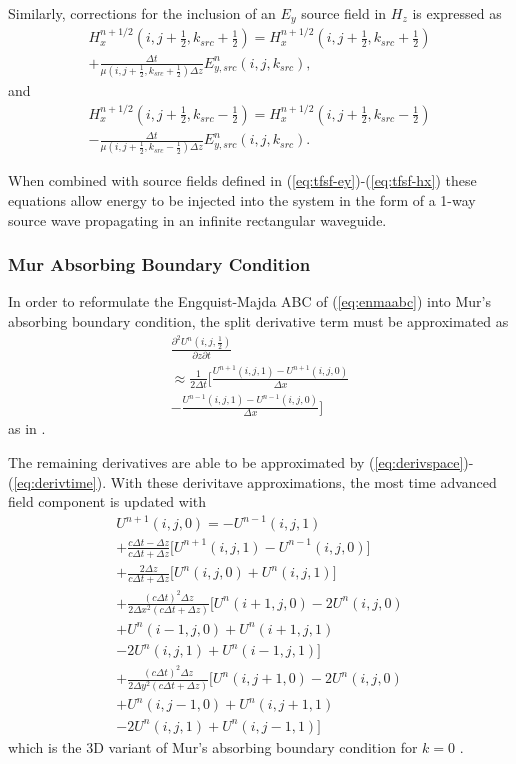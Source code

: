 Similarly, corrections for the inclusion of an $E_y$ source field in $H_z$ is expressed as
\begin{multline}
	H_x^{n+1/2}(i,j+\tfrac{1}{2},k_{src}+\tfrac{1}{2}) = H_x^{n+1/2}(i,j+\tfrac{1}{2},k_{src}+\tfrac{1}{2}) \\
	+\frac{\Delta t}{\mu(i,j+\tfrac{1}{2},k_{src}+\tfrac{1}{2})\Delta z}E_{y,src}^n(i,j,k_{src}),
\end{multline}
and
\begin{multline}
	H_x^{n+1/2}(i,j+\tfrac{1}{2},k_{src}-\tfrac{1}{2}) = H_x^{n+1/2}(i,j+\tfrac{1}{2},k_{src}-\tfrac{1}{2}) \\
	-\frac{\Delta t}{\mu(i,j+\tfrac{1}{2},k_{src}-\tfrac{1}{2})\Delta z}E_{y,src}^n(i,j,k_{src}).
\end{multline}

When combined with source fields defined in  (\ref{eq:tfsf-ey})-(\ref{eq:tfsf-hx}) these equations allow energy to be injected into the system in the form of a 1-way source wave propagating in an infinite rectangular waveguide\cite{taftlovefdtd}.

\subsubsection{Mur Absorbing Boundary Condition}
\label{subsubsec:mur-timestep}
In order to reformulate the Engquist-Majda ABC of  (\ref{eq:enmaabc}) into Mur's absorbing boundary condition, the split derivative term must be approximated as
\begin{multline}
	\frac{\partial^2 U^n(i,j,\tfrac{1}{2})}{\partial z\partial t} \\ \approx\frac{1}{2\Delta t}\bigg[\frac{U^{n+1}(i,j,1)-U^{n+1}(i,j,0)}{\Delta x} \\ -\frac{U^{n-1}(i,j,1)-U^{n-1}(i,j,0)}{\Delta x}\bigg]
\end{multline}
as in \cite{taftlovefdtd}.

The remaining derivatives are able to be approximated by  (\ref{eq:derivspace})-(\ref{eq:derivtime}). With these derivitave approximations, the most time advanced field component is updated with
\begin{multline}
	U^{n+1}(i,j,0) = -U^{n-1}(i,j,1) \\
	+\frac{c\Delta t - \Delta z}{c\Delta t + \Delta z}\bigg[U^{n+1}(i,j,1)-U^{n-1}(i,j,0)\bigg] \\ 
	+\frac{2\Delta z}{c\Delta t+\Delta z}\bigg[U^n(i,j,0)+U^n(i,j,1)\bigg] \\
	+\frac{(c\Delta t)^2\Delta z}{2\Delta x^2(c\Delta t+\Delta z)}\bigg[U^n(i+1,j,0)-2U^n(i,j,0) \\ 
	+U^n(i-1,j,0) + U^n(i+1,j,1) \\ -2U^n(i,j,1)+U^n(i-1,j,1)\bigg] \\ 
	+\frac{(c\Delta t)^2\Delta z}{2\Delta y^2(c\Delta t+\Delta z)}\bigg[U^n(i,j+1,0)-2U^n(i,j,0) \\ 
	+U^n(i,j-1,0) + U^n(i,j+1,1) \\ -2U^n(i,j,1)+U^n(i,j-1,1)\bigg]
\end{multline}
which is the 3D variant of Mur's absorbing boundary condition for $k=0$ \cite{taftlovefdtd}.